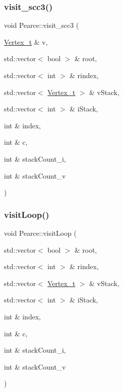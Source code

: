 \mbox{\label{class_pearce_a70800d4564b36fb64762d3a78f1f67d8}} 
\subsubsection{\texorpdfstring{visit\+\_\+scc3()}{visit\_scc3()}}
{\footnotesize\ttfamily void Pearce\+::visit\+\_\+scc3 (\begin{DoxyParamCaption}\item[{\hyperlink{class_graph_component_ae67114a6ce5a001dc35e1996e1b45aa0}{Vertex\+\_\+t} \&}]{v,  }\item[{std\+::vector$<$ bool $>$ \&}]{root,  }\item[{std\+::vector$<$ int $>$ \&}]{rindex,  }\item[{std\+::vector$<$ \hyperlink{class_graph_component_ae67114a6ce5a001dc35e1996e1b45aa0}{Vertex\+\_\+t} $>$ \&}]{v\+Stack,  }\item[{std\+::vector$<$ int $>$ \&}]{i\+Stack,  }\item[{int \&}]{index,  }\item[{int \&}]{c,  }\item[{int \&}]{stack\+Count\+\_\+i,  }\item[{int \&}]{stack\+Count\+\_\+v }\end{DoxyParamCaption})}

\mbox{\label{class_pearce_a323fc3337d5849680065986d6ef7163c}} 
\subsubsection{\texorpdfstring{visit\+Loop()}{visitLoop()}}
{\footnotesize\ttfamily void Pearce\+::visit\+Loop (\begin{DoxyParamCaption}\item[{std\+::vector$<$ bool $>$ \&}]{root,  }\item[{std\+::vector$<$ int $>$ \&}]{rindex,  }\item[{std\+::vector$<$ \hyperlink{class_graph_component_ae67114a6ce5a001dc35e1996e1b45aa0}{Vertex\+\_\+t} $>$ \&}]{v\+Stack,  }\item[{std\+::vector$<$ int $>$ \&}]{i\+Stack,  }\item[{int \&}]{index,  }\item[{int \&}]{c,  }\item[{int \&}]{stack\+Count\+\_\+i,  }\item[{int \&}]{stack\+Count\+\_\+v }\end{DoxyParamCaption})}



